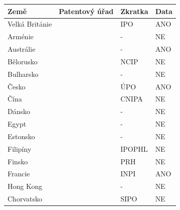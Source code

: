 	\begin{table}[H]
	\centering
	\begin{tabular}{|>{\centering\arraybackslash}p{2.2cm}|>{\centering\arraybackslash}p{7.5cm}|>{\centering\arraybackslash}p{2cm}|>{\centering\arraybackslash}p{1cm}|} 
	\hline
	\textbf{Země}    & \textbf{Patentový úřad} & \textbf{Zkratka} & \textbf{Data}                \\ 
	\hline
	Velká Británie & \MYhref{https://www.gov.uk/topic/intellectual-property}{Intellectual Property Office}  & IPO & ANO        \\ 
	\hline
	Arménie & \MYhref{https://www.aipa.am/hy/}{Intellectual Property Office}  & - & NE        \\ 
	\hline
	Austrálie & \MYhref{https://www.ipaustralia.gov.au/}{IP Australia}  & - & ANO         \\ 
	\hline
	Bělorusko & \MYhref{https://www.ncip.by/}{National Center of Intellectual Property}  & NCIP & NE         \\ 
	\hline
	Bulharsko & \MYhref{https://www.bpo.bg/}{Patent Office of Republic of Bulgaria}  & -  & NE       \\ 
	\hline
	Česko & \MYhref{https://upv.gov.cz/}{Industrial Property Office of the Czech Republic}  & ÚPO   & ANO      \\ 
	\hline
	Čína & \MYhref{https://www.cnipa.gov.cn/}{China National Intellectual Property Administration}  & CNIPA   & NE      \\ 
	\hline
	Dánsko & \MYhref{https://www.dkpto.org/}{Danish Patent and Trademark Office}  & -    & NE     \\ 
	\hline
	Egypt & \MYhref{http://www.egypo.gov.eg}{Egyptian Patent Office}  & -   & NE      \\ 
	\hline
	Estonsko & \MYhref{https://www.epa.ee/et}{The Estonian Patent Office}  & -   & NE      \\ 
	\hline
	Filipíny & \MYhref{http://www.ipophil.gov.ph/}{Intellectual Property Office of the Philippines}  & IPOPHL & NE        \\ 
	\hline
	Finsko & \MYhref{http://www.prh.fi/en/index.html}{Finnish Patent and Registration Office}  & PRH   & NE      \\ 
	\hline
	Francie & \MYhref{http://www.inpi.fr/}{National Institute of Industrial Property}  & INPI   & ANO      \\ 
	\hline
	Hong Kong & \MYhref{https://www.ipd.gov.hk/index.htm}{Intellectual Property Department}  & -   & NE      \\ 
	\hline
	Chorvatsko & \MYhref{https://www.dziv.hr/}{State Intellectual Property Office of the Republic of Croatia}  & SIPO  & NE       \\ 

\end{tabular}
\end{table}
